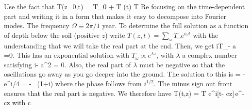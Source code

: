 \documentclass[11pt]{book}
\begin{document}
%

Use the fact that
\be T(z=0,t) = T_0 + \Delta T \cos(\omega t) \rightarrow \Delta T {\rm Re}
\ee
 focusing on the time-dependent part and writing it in a form that makes it easy to decompose into Fourier modes. The frequency $\Omega \equiv 2\pi/1$ year. To determine the full solution as a function of depth below the soil (positive $z$) write $T(z,t)=\sum_\omega T_\omega e^{i\omega t}$ with the understanding that we will take the real part at the end. Then, we get
\be
i\omega T_\omega - a =0.\ee
This has an exponential solution with $T_\omega \propto e^{\lambda z}$, with $\lambda$ a complex number satisfying
\be
i\omega - a\lambda^2 = 0.\ee
Also, the real part of $\lambda$ must be negative so that the oscillations go away as you go deeper into the ground. The solution to this is
\be
\lambda = -\, e^{i\pi/4} = - \, (1+i)
\ee
where the phase follows from $i^{1/2}$. The minus sign out front ensures that the real part is negative. We therefore have
\be
T(t,z) = \Delta T e^{i[\omega t- cz]}\,e^{-cz}
\ee
with
\be
c\equiv {}\ee
\end{document}
